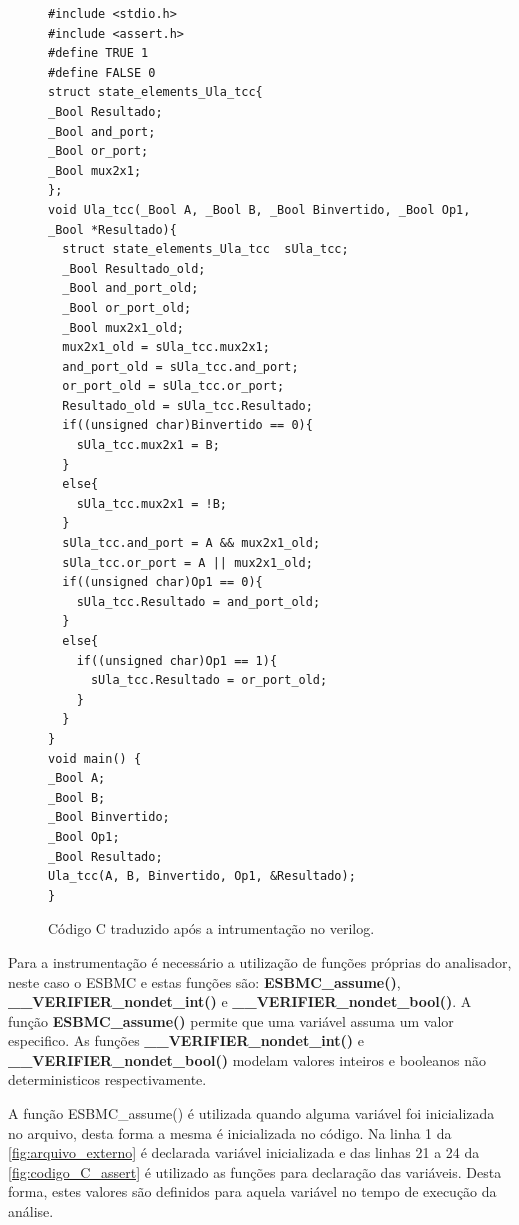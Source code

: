 \begin{figure}[H]
\caption{\label{fig:codigo_C} Código C traduzido após a intrumentação no verilog.}
	\begin{center}
    \begin{minipage}{0.7\textwidth}
    \begin{lstlisting}
#include <stdio.h>
#include <assert.h>
#define TRUE 1
#define FALSE 0
struct state_elements_Ula_tcc{
_Bool Resultado;
_Bool and_port;
_Bool or_port;
_Bool mux2x1;
};
void Ula_tcc(_Bool A, _Bool B, _Bool Binvertido, _Bool Op1, _Bool *Resultado){
  struct state_elements_Ula_tcc  sUla_tcc;
  _Bool Resultado_old;
  _Bool and_port_old;
  _Bool or_port_old;
  _Bool mux2x1_old;
  mux2x1_old = sUla_tcc.mux2x1;
  and_port_old = sUla_tcc.and_port;
  or_port_old = sUla_tcc.or_port;
  Resultado_old = sUla_tcc.Resultado;
  if((unsigned char)Binvertido == 0){
    sUla_tcc.mux2x1 = B;
  }
  else{
    sUla_tcc.mux2x1 = !B;
  }
  sUla_tcc.and_port = A && mux2x1_old;
  sUla_tcc.or_port = A || mux2x1_old;
  if((unsigned char)Op1 == 0){
    sUla_tcc.Resultado = and_port_old;
  }
  else{
    if((unsigned char)Op1 == 1){
      sUla_tcc.Resultado = or_port_old;
    }
  }
}
void main() {
_Bool A;
_Bool B;
_Bool Binvertido;
_Bool Op1;
_Bool Resultado;
Ula_tcc(A, B, Binvertido, Op1, &Resultado);
}
    \end{lstlisting}
    \end{minipage}
	\end{center}
\end{figure}

\par
Para a instrumentação é necessário a utilização de funções próprias do analisador, neste caso o ESBMC \cite{esbmc} e estas funções são: \textbf{ESBMC\_assume()}, \textbf{\_\_VERIFIER\_nondet\_int()} e \textbf{\_\_VERIFIER\_nondet\_bool()}. A função \textbf{ESBMC\_assume()} permite que uma variável assuma um valor especifico. As funções \textbf{\_\_VERIFIER\_nondet\_int()} e \textbf{\_\_VERIFIER\_nondet\_bool()} modelam valores inteiros e booleanos não deterministicos respectivamente.

\par
A função ESBMC\_assume() é utilizada quando alguma variável foi inicializada no arquivo, desta forma a mesma é inicializada no código. Na linha 1 da \autoref{fig:arquivo_externo} é declarada variável inicializada e das linhas 21 a 24 da \autoref{fig:codigo_C_assert} é utilizado as funções para declaração das variáveis. Desta forma,  estes valores são definidos para aquela variável no tempo de execução da análise. 

